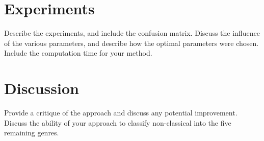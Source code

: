 \documentclass[12pt]{article}
\begin{document}
\section{Experiments}
Describe the experiments, and include the confusion matrix. Discuss
the influence of the various parameters, and describe how the optimal
parameters were chosen. Include the computation time for your method.
\section{Discussion}
Provide a critique of the approach and discuss any potential
improvement. Discuss the ability of your approach to classify
non-classical into the five remaining genres.
\end{document}
